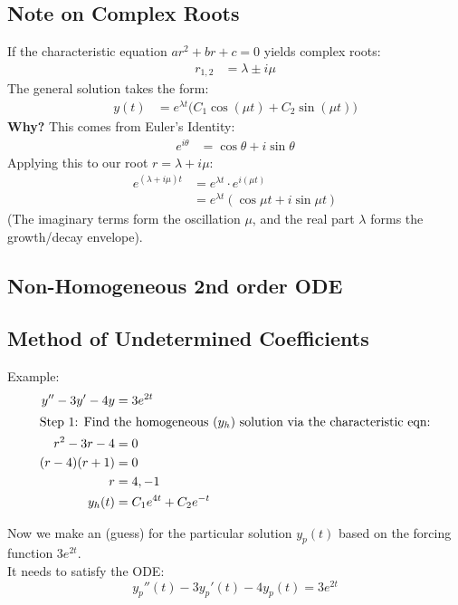 \documentclass[11pt]{article}
\begin{document}
\subsection*{Note on Complex Roots}
If the characteristic equation $ar^2+br+c=0$ yields complex roots:
\begin{align*}
    r_{1,2} &= \lambda \pm i\mu
\end{align*}
The general solution takes the form:
\begin{align*}
    y(t) &= e^{\lambda t} \Big( C_1 \cos(\mu t) + C_2 \sin(\mu t) \Big)
\end{align*}
\textbf{Why?} This comes from Euler's Identity:
\begin{align*}
    e^{i\theta} &= \cos \theta + i \sin \theta
\end{align*}
Applying this to our root $r = \lambda + i\mu$:
\begin{align*}
    e^{(\lambda + i\mu)t} &= e^{\lambda t} \cdot e^{i(\mu t)} \\
    &= e^{\lambda t} (\cos \mu t + i \sin \mu t)
\end{align*}
(The imaginary terms form the oscillation $\mu$, and the real part $\lambda$ forms the growth/decay envelope).

\subsection{Non-Homogeneous 2nd order ODE}
\subsection*{Method of Undetermined Coefficients}
Example:
\begin{align*}
    y''-3y'-4y &= 3e^{2t} \\
    \intertext{Step 1: Find the homogeneous ($y_h$) solution via the characteristic eqn:}
    r^2-3r-4 &= 0 \\
    (r-4)(r+1) &= 0 \\
    r &= 4, -1 \\
    y_h(t) &= C_1e^{4t} + C_2e^{-t}
\end{align*}

Now we make an  (guess) for the particular solution $y_p(t)$ based on the forcing function $3e^{2t}$.
\\
It needs to satisfy the ODE:
\[ y_p''(t) - 3y_p'(t) - 4y_p(t) = 3e^{2t} \]
\end{document}
